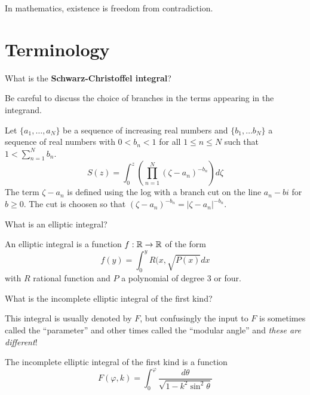 \documentclass{homework}
\author{Jim Fowler}
\begin{document}
\maketitle

\begin{inspiration}
In mathematics, existence is freedom from contradiction.
\end{inspiration}

\section{Terminology}

\begin{problem}
  What is the \textbf{Schwarz-Christoffel integral}?

    Be careful to discuss the choice of branches in the terms appearing
      in the integrand.
      \end{problem}
      \begin{solution}
      Let $\{a_1, \dots, a_N\}$ be a sequence of increasing real numbers and $\{b_1, \dots b_N\}$ a sequence of real numbers with $0<b_n<1$ for all $1\leq n\leq N$ such that $1 < \sum_{n=1}^N b_n$.
      \[
      S(z) = \int_0^z \left( \prod_{n=1}^N (\zeta - a_n)^{-b_n} \right) d\zeta
      \]
      The term $\zeta - a_n$ is defined using the log with a branch cut on the line $a_n - bi$ for $b\geq 0$. The cut is choosen so that $(\zeta - a_n)^{-b_n} = |\zeta - a_n|^{-b_n}$.
      \end{solution}
      \begin{problem}
        What is an elliptic integral?
        \end{problem}
        \begin{solution}
        An elliptic integral is a function $f:\mathbb{R}\to \mathbb{R}$ of the form
        \[
        f(y) = \int_0^y R(x, \sqrt{P(x)} dx
        \]
        with $R$ rational function and $P$ a polynomial of degree 3 or four.

        \end{solution}
        \begin{problem}
          What is the incomplete elliptic integral of the first kind?

            This integral is usually denoted by $F$, but confusingly the input
              to $F$ is sometimes called the ``parameter'' and other times called
                the ``modular angle'' and \textit{these are different}!
                \end{problem}
                \begin{solution}
                The incomplete elliptic integral of the first kind is a function 
                \[
                F(\varphi, k) = \int_0^\varphi \frac{d\theta}{\sqrt{1- k^2\sin^2\theta}}
                \]

                \end{solution}
\end{document}
